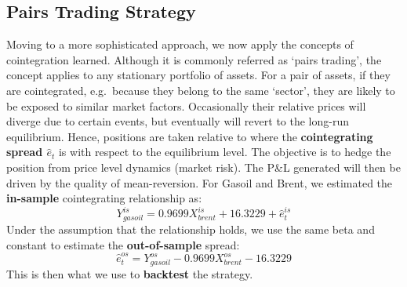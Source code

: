 \documentclass[11pt]{article}
\begin{document}
    \subsection{Pairs Trading Strategy}\label{pairs-trading-strategy}
    Moving to a more sophisticated approach, we now apply the concepts of
cointegration learned. Although it is commonly referred as `pairs
trading', the concept applies to any stationary portfolio of assets.
For a pair of assets, if they are cointegrated, e.g.~because they belong
to the same `sector', they are likely to be exposed to similar market
factors. Occasionally their relative prices will diverge due to certain
events, but eventually will revert to the long-run equilibrium. Hence,
positions are taken relative to where the \textbf{cointegrating spread
\(\hat{e}_t\)} is with respect to the equilibrium level. The objective
is to hedge the position from price level dynamics (market risk). The
P\&L generated will then be driven by the quality of mean-reversion.
For Gasoil and Brent, we estimated the \textbf{in-sample} cointegrating
relationship as:
\begin{equation}
Y_{gasoil}^{is} = 0.9699 X_{brent}^{is}  + 16.3229 + \hat{e}_t^{is}
\end{equation}
Under the assumption that the relationship holds, we use the same beta
and constant to estimate the \textbf{out-of-sample} spread:
\begin{equation}
\hat{e}_t^{os} = Y_{gasoil}^{os} - 0.9699 X_{brent}^{os}  - 16.3229 
\end{equation}
This is then what we use to \textbf{backtest} the strategy.
\end{document}
